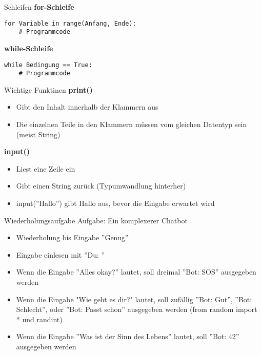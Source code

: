 \begin{frame}[fragile]{Schleifen}
\textbf{for-Schleife}
\begin{lstlisting}
for Variable in range(Anfang, Ende):
	# Programmcode
\end{lstlisting}

\textbf{while-Schleife}
\begin{lstlisting}
while Bedingung == True:
	# Programmcode
\end{lstlisting}
\end{frame}

\begin{frame}[fragile]{Wichtige Funktinen}
\textbf{print()}
\begin{itemize}
	\item Gibt den Inhalt innerhalb der Klammern aus
	\item Die einzelnen Teile in den Klammern müssen vom gleichen Datentyp sein (meist String)
\end{itemize}

\textbf{input()}
\begin{itemize}
	\item Liest eine Zeile ein
	\item Gibt einen String zurück (Typumwandlung hinterher)
	\item input(''Hallo'') gibt Hallo aus, bevor die Eingabe erwartet wird
\end{itemize}
\end{frame}


\begin{frame}[fragile]{Wiederholungsaufgabe}
	Aufgabe: Ein komplexerer Chatbot\\
	\begin{itemize}
		\item Wiederholung bis Eingabe ''Genug''
		\item Eingabe einlesen mit ''Du: ''
		\item Wenn die Eingabe ''Alles okay?'' lautet, soll dreimal ''Bot: SOS'' ausgegeben werden
		\item Wenn die Eingabe "Wie geht es dir?" lautet, soll zufällig ''Bot: Gut'', ''Bot: Schlecht'', oder ''Bot: Passt schon'' ausgegeben werden (from random import *  und randint)
		\item Wenn die Eingabe ''Was ist der Sinn des Lebens'' lautet, soll ''Bot: 42'' ausgegeben werden
	\end{itemize}
	
\end{frame}

